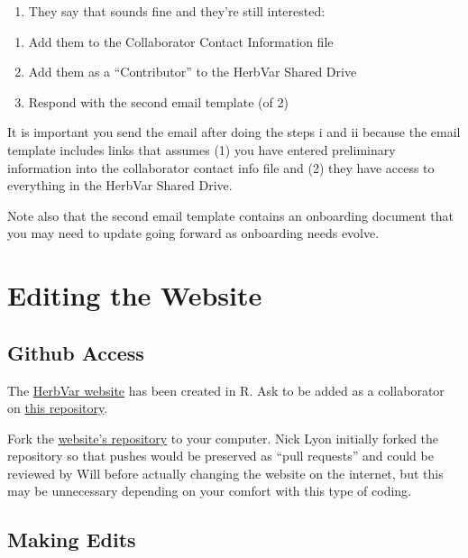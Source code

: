 \documentclass[
  letterpaper,
  DIV=11,
  numbers=noendperiod]{scrreprt}
\providecommand{\tightlist}{%
  \setlength{\itemsep}{0pt}\setlength{\parskip}{0pt}}\usepackage{longtable,booktabs,array}
\begin{document}
\begin{enumerate}
\def\labelenumi{\alph{enumi})}
\setcounter{enumi}{1}
\tightlist
\item
  They say that sounds fine and they're still interested:
\end{enumerate}

\begin{enumerate}
\def\labelenumi{\roman{enumi}.}
\item
  Add them to the Collaborator Contact Information file
\item
  Add them as a ``Contributor'' to the HerbVar Shared Drive
\item
  Respond with the second email template (of 2)
\end{enumerate}

It is important you send the email after doing the steps i and ii
because the email template includes links that assumes (1) you have
entered preliminary information into the collaborator contact info file
and (2) they have access to everything in the HerbVar Shared Drive.

Note also that the second email template contains an onboarding document
that you may need to update going forward as onboarding needs evolve.

\chapter{Editing the Website}\label{editing-the-website}

\section{Github Access}\label{github-access}

The \href{https://herbvar.org/index.html}{HerbVar website} has been
created in R. Ask to be added as a collaborator on
\href{https://github.com/HerbVar-Network/HerbVar-website}{this
repository}.

Fork the
\href{https://github.com/HerbVar-Network/HerbVar-website}{website's
repository} to your computer. Nick Lyon initially forked the repository
so that pushes would be preserved as ``pull requests'' and could be
reviewed by Will before actually changing the website on the internet,
but this may be unnecessary depending on your comfort with this type of
coding.

\section{Making Edits}\label{making-edits}
\end{document}
